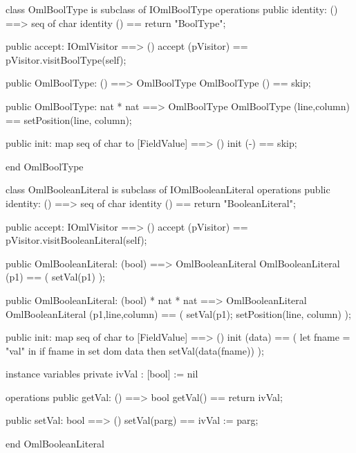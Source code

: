 \begin{vdm_al}
class OmlBoolType is subclass of IOmlBoolType
operations
  public identity: () ==> seq of char
  identity () == return "BoolType";

  public accept: IOmlVisitor ==> ()
  accept (pVisitor) == pVisitor.visitBoolType(self);

  public OmlBoolType:
    () ==> OmlBoolType
  OmlBoolType () == 
    skip;

  public OmlBoolType:
    nat *
    nat ==> OmlBoolType
  OmlBoolType (line,column) == 
    setPosition(line, column);

  public init: map seq of char to [FieldValue] ==> ()
  init (-) == skip;

end OmlBoolType
\end{vdm_al}

\begin{vdm_al}
class OmlBooleanLiteral is subclass of IOmlBooleanLiteral
operations
  public identity: () ==> seq of char
  identity () == return "BooleanLiteral";

  public accept: IOmlVisitor ==> ()
  accept (pVisitor) == pVisitor.visitBooleanLiteral(self);

  public OmlBooleanLiteral:
    (bool) ==> OmlBooleanLiteral
  OmlBooleanLiteral (p1) == 
    ( setVal(p1) );

  public OmlBooleanLiteral:
    (bool) *
    nat *
    nat ==> OmlBooleanLiteral
  OmlBooleanLiteral (p1,line,column) == 
    ( setVal(p1);
      setPosition(line, column) );

  public init: map seq of char to [FieldValue] ==> ()
  init (data) ==
    ( let fname = "val" in
        if fname in set dom data
        then setVal(data(fname)) );

instance variables
  private ivVal : [bool] := nil

operations
  public getVal: () ==> bool
  getVal() == return ivVal;

  public setVal: bool ==> ()
  setVal(parg) == ivVal := parg;

end OmlBooleanLiteral
\end{vdm_al}

